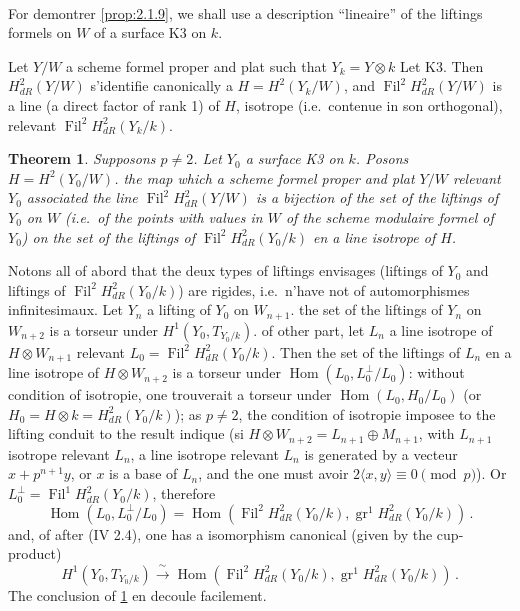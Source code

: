 \documentclass[12pt,a4paper]{article}
\theoremstyle{plain}
\newtheorem{theorem}{Theorem}[section]
\theoremstyle{definition}
\theoremstyle{remark}
\DeclareMathOperator{\Hom}{Hom}
\DeclareMathOperator{\gr}{gr}
\DeclareMathOperator{\Fil}{Fil}
\begin{document}
\paragraph{}

For demontrer \ref{prop:2.1.9}, we shall use a description ``lineaire'' of the liftings formels on $W$ of a surface K3 on $k$.

Let $Y/W$ a scheme formel proper and plat such that $Y_k = Y \otimes k$ Let K3. Then $H_{dR}^2(Y/W)$ s'identifie canonically a $H = H^2(Y_k/W)$, and $\Fil^2H_{dR}^2(Y/W)$ is a line (a direct factor of rank 1) of $H$, isotrope (i.e.\ contenue in son orthogonal), relevant $\Fil^2H_{dR}^2(Y_k/k)$.

\begin{theorem}\label{thm:2.1.11}
Supposons $p \neq 2$. Let $Y_0$ a surface K3 on $k$. Posons $H = H^2(Y_0/W)$. the map which a scheme formel proper and plat $Y/W$ relevant $Y_0$ associated the line $\Fil^2H_{dR}^2(Y/W)$ is a bijection of the set of the liftings of $Y_0$ on $W$ (i.e.\ of the points with values in $W$ of the scheme modulaire formel of $Y_0$) on the set of the liftings of $\Fil^2H_{dR}^2(Y_0/k)$ en a line isotrope of $H$.
\end{theorem}

Notons all of abord that the deux types of liftings envisages (liftings of $Y_0$ and liftings of $\Fil^2H_{dR}^2(Y_0/k)$) are rigides, i.e.\ n'have not of automorphismes infinitesimaux. Let $Y_n$ a lifting of $Y_0$ on $W_{n+1}$. the set of the liftings of $Y_n$ on $W_{n+2}$ is a torseur under $H^1(Y_0, T_{Y_0/k})$. of other part, let $L_n$ a line isotrope of $H \otimes W_{n+1}$ relevant $L_0 = \Fil^2H_{dR}^2(Y_0/k)$. Then the set of the liftings of $L_n$ en a line isotrope of $H \otimes W_{n+2}$ is a torseur under $\Hom(L_0, L_0^\perp/L_0)$: without condition of isotropie, one trouverait a torseur under $\Hom(L_0, H_0/L_0)$ (or $H_0 = H \otimes k = H_{dR}^2(Y_0/k)$); as $p \neq 2$, the condition of isotropie imposee to the lifting conduit to the result indique (si $H \otimes W_{n+2} = L_{n+1} \oplus M_{n+1}$, with $L_{n+1}$ isotrope relevant $L_n$, a line isotrope relevant $L_n$ is generated by a vecteur $x + p^{n+1}y$, or $x$ is a base of $L_n$, and the one must avoir $2\langle x, y\rangle \equiv 0 \pmod{p}$). Or $L_0^\perp = \Fil^1H_{dR}^2(Y_0/k)$, therefore
\[
\Hom(L_0, L_0^\perp/L_0) = \Hom(\Fil^2H_{dR}^2(Y_0/k), \gr^1H_{dR}^2(Y_0/k))\,.\]
and, of after (IV 2.4), one has a isomorphism canonical (given by the cup-product)
\[
H^1(Y_0, T_{Y_0/k}) \xrightarrow{\;\sim\;} \Hom(\Fil^2H_{dR}^2(Y_0/k), \gr^1H_{dR}^2(Y_0/k))\,.\]
The conclusion of \ref{thm:2.1.11} en decoule facilement.
\end{document}
